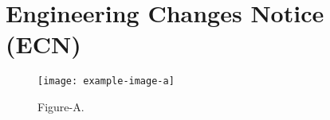 
\chapter{Engineering Changes Notice (ECN)}

\begin{figure}[!htp]
    \centering
    \texttt{[image: example-image-a]}
    \caption{Figure-A.}
    \label{fig:a}
\end{figure}

